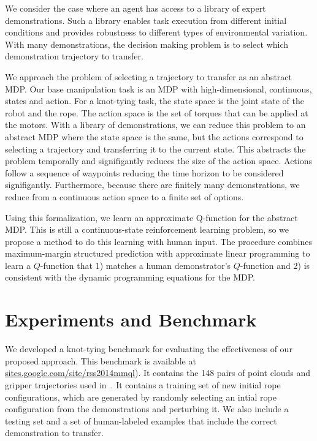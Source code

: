 \documentclass[conference]{IEEEtran}
\begin{document}
We consider the case where an agent has access to a library of expert
demonstrations. Such a library enables task execution from different
initial conditions and provides robustness to different types of
environmental variation. With many demonstrations, the decision making
problem is to select which demonstration trajectory to transfer.

We approach the problem of selecting a trajectory to transfer as an
abstract MDP. Our base manipulation task is an MDP with
high-dimensional, continuous, states and action. For a knot-tying
task, the state space is the joint state of the robot and the
rope. The action space is the set of torques that can be applied at
the motors. With a library of demonstrations, we can reduce this
problem to an abstract MDP where the state space is the same, but the
actions correspond to selecting a trajectory and transferring it to
the current state. This abstracts the problem temporally and
signifigantly reduces the size of the action space. Actions follow a
sequence of waypoints reducing the time horizon to be considered
signifigantly. Furthermore, because there are finitely many
demonstrations, we reduce from a continuous action space to a finite
set of options.

Using this formalization, we learn an approximate Q-function for the
abstract MDP. This is still a continuous-state reinforcement learning
problem, so we propose a method to do this learning with human
input. The procedure combines maximum-margin structured prediction
with approximate linear programming to learn a $Q$-function that 1)
matches a human demonstrator's $Q$-function and 2) is consistent
with the dynamic programming equations for the MDP. 

\section{Experiments and Benchmark}

We developed a knot-tying benchmark for evaluating the effectiveness
of our proposed approach.  This benchmark is available at
\href{https://sites.google.com/site/rss2014mmql}{sites.google.com/site/rss2014mmql}). It
contains the 148 pairs of point clouds and gripper trajectories used
in~\citet{Schulmanetal_ISRR2013}. It contains a training set of new
initial rope configurations, which are generated by randomly selecting
an intial rope configuration from the demonstrations and perturbing
it. We also include a testing set and a set of human-labeled examples
that include the correct demonstration to transfer.
\end{document}
